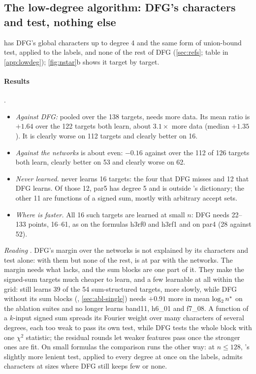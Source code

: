 \subsection{The low-degree algorithm: DFG's characters and test, nothing else}\label{sec:res-lowdeg}

 has DFG's global characters up to degree 4 and the same form of union-bound test, applied to the labels, and none of the rest of DFG (\cref{sec:refs}; table in \cref{app:lowdeg}); \cref{fig:nstar}b shows it target by target.

\paragraph{Results} .
\begin{itemize}
\item \emph{Against DFG:} pooled over the 138 targets,  needs more data. Its mean ratio is $+1.64$ over the 122 targets both learn, about $3.1\times$ more data (median $+1.35$). It is clearly worse on 112 targets and clearly better on 16.
\item \emph{Against the networks}  is about even: $-0.16$ against  over the 112 of 126 targets both learn, clearly better on 53 and clearly worse on 62.
\item \emph{Never learned.}  never learns 16 targets: the four that DFG misses and 12 that DFG learns. Of those 12, par5 has degree 5 and is outside 's dictionary; the other 11 are functions of a signed sum, mostly with arbitrary accept sets.
\item \emph{Where  is faster.} All 16 such targets are learned at small $n$: DFG needs 22--133 points,  16--61, as on the formulas h3rf0 and h3rf1 and on par4 (28 against 52).
\end{itemize}

\emph{Reading} . DFG's margin over the networks is not explained by its characters and test alone: with them but none of the rest,  is at par with the networks. The margin needs what  lacks, and the sum blocks are one part of it. They make the signed-sum targets much cheaper to learn, and a few learnable at all within the grid:  still learns 39 of the 54 sum-structured targets, more slowly, while DFG without its sum blocks (, \cref{sec:abl-single}) needs $+0.91$ more in mean $\log_2n^{*}$ on the ablation suites and no longer learns band11, h6\_01 and f7\_08. A function of a $k$-input signed sum spreads its Fourier weight over many characters of several degrees, each too weak to pass its own test, while DFG tests the whole block with one $\chi^2$ statistic; the residual rounds let weaker features pass once the stronger ones are fit. On small formulas the comparison runs the other way: at $n\le128$, 's slightly more lenient test, applied to every degree at once on the labels, admits characters at sizes where DFG still keeps few or none.

